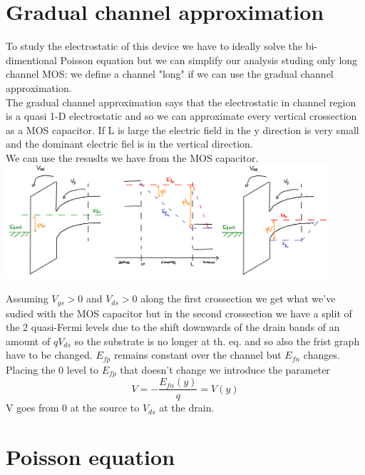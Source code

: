 \section{Gradual channel approximation}
To study the electrostatic of this device we have to ideally solve the bi-dimentional Poisson equation but we can simplify our analysis studing only long channel MOS: we define a channel "long" if we can use the gradual channel approximation.\\
The gradual channel approximation says that the electrostatic in channel region is a quasi 1-D electrostatic and so we can approximate every vertical crossection as a MOS capacitor. If L is large the electric field in the y direction is very small and the dominant electric fiel is in the vertical direction.\\
We can use the resuslts we have from the MOS capacitor.\\

\centering
\includegraphics[width=0.9\textwidth]{mos2.png}\\
\raggedright

Assuming $V_{gs}>0$ and $V_{ds}>0$ along the first crossection we get what we've sudied with the MOS capacitor but in the second crossection we have a split of the 2 quasi-Fermi levels due to the shift downwards of the drain bands of an amount of $qV_{ds}$ so the substrate is no longer at th. eq. and so also the frist graph have to be changed. $E_{fp}$ remains constant over the channel but $E_{fn}$ changes.\\
Placing the 0 level to $E_{fp}$ that doesn't change we introduce the parameter 
\begin{equation}
V=-\frac{E_{fn}(y)}{q}=V(y)
\end{equation}
V goes from 0 at the source to $V_{ds}$ at the drain.\\


\section{Poisson equation}

